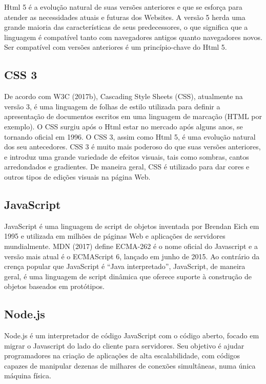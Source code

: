 \documentclass{automatextcc}
\begin{document}
Html 5 é a evolução natural de suas versões anteriores e que se esforça para atender as necessidades atuais e futuras dos Websites. A versão 5 herda uma grande maioria das características de seus predecessores, o que significa que a linguagem é compatível tanto com navegadores antigos quanto navegadores novos. Ser compatível com versões anteriores é um princípio-chave do Html 5. 



\subsection{CSS 3}

De acordo com W3C (2017b), Cascading Style Sheets (CSS), atualmente na versão 3, é uma linguagem de folhas de estilo utilizada para definir a apresentação de documentos escritos em uma linguagem de marcação (HTML por exemplo). O CSS surgiu após o Html estar no mercado após alguns anos, se tornando oficial em 1996. O CSS 3, assim como Html 5, é uma evolução natural dos seu antecedores. CSS 3 é muito mais poderoso do que suas versões anteriores, e introduz uma grande variedade de efeitos visuais, tais como sombras, cantos arredondados e gradientes. De maneira geral, CSS é utilizado para dar cores e outros tipos de edições visuais na página Web.


\subsection{JavaScript}

JavaScript é uma linguagem de script de objetos inventada por Brendan Eich em 1995 e utilizada em milhões de páginas Web e aplicações de servidores mundialmente. MDN (2017) define ECMA-262 é o nome oficial do Javascript e a versão mais atual é o ECMAScript 6, lançado em junho de 2015. Ao contrário da crença popular que JavaScript é “Java interpretado”, JavaScript, de maneira geral, é uma linguagem de script dinâmica que oferece suporte à construção de objetos baseados em protótipos. 

\subsection{Node.js}

Node.js é um interpretador de código JavaScript com o código aberto, focado em migrar o Javascript do lado do cliente para servidores. Seu objetivo é ajudar programadores na criação de aplicações de alta escalabilidade, com códigos capazes de manipular dezenas de milhares de conexões simultâneas, numa única máquina física.
\end{document}
